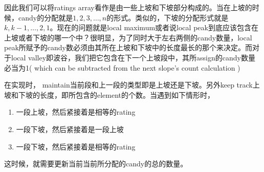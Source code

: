 因此我们可以将ratings array看作是由一些上坡和下坡部分构成的。当在上坡的时候，candy的分配就是$1,2,3,\ldots,n$的形式。类似的，下坡的分配形式就是$k, k-1, \ldots, 2,1$。现在的问题就是local maximum或者说local peak到底应该包含在上坡或者下坡的哪一个中？很明显，为了同时大于左右两侧的candy数量，local peak所赋予的candy数必须由其所在上坡和下坡中的长度最长的那个来决定。而对于local valley即波谷，我们把它包含在下一个上坡段中，其所assign的candy数量必当为1( which can be subtracted from the next slope's count calculation )

在实现时， maintain当前段和上一段的类型即是上坡还是下坡。另外keep track上坡和下坡的长度，即所包含的element的个数。当遇到如下情形时，
\begin{enumerate}
\item 一段上坡，然后紧接着是相等的rating
\item 一段下坡，然后紧接着是一段上坡
\item 一段下坡，然后紧接着是相等的rating
\end{enumerate}
这时候，就需要更新当前当前所分配的candy的总的数量。


